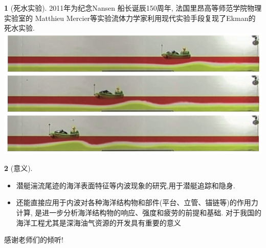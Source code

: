 \documentclass[UTF8]{ctexbeamer}	%
\theoremstyle{plain}
\theoremstyle{definition}
\newtheorem{emt}{}[section]
\theoremstyle{remark}
\numberwithin{equation}{section}
\begin{document}
\begin{frame}
    \begin{emt}[死水实验\cite{npg-18-193-2011}]
        2011年为纪念Nansen 船长诞辰150周年, 法国里昂高等师范学院物理实验室的
        Matthieu Mercier等实验流体力学家利用现代实验手段复现了Ekman的死水实验.
        \includegraphics[width = \textwidth]{fig/s4p1.png}
    \end{emt}
\end{frame}

\begin{frame}
    \begin{emt}[意义\cite{wangzhan_1589}]
        \begin{itemize}
            \item 潜艇湍流尾迹的海洋表面特征等内波现象的研究,用于潜艇追踪和隐身.
            \item 还能直接应用于内波对各种海洋结构物和部件(平台、立管、锚链等)的作用力计算,
            是进一步分析海洋结构物的响应、强度和疲劳的前提和基础.
            对于我国的海洋工程尤其是深海油气资源的开发具有重要的意义
        \end{itemize}
        
    \end{emt}
    
\end{frame}

\begin{frame}
    


\end{frame}

\begin{frame}
    \begin{center}
        \Huge 感谢老师们的倾听!
    \end{center}
\end{frame}


\end{document}
